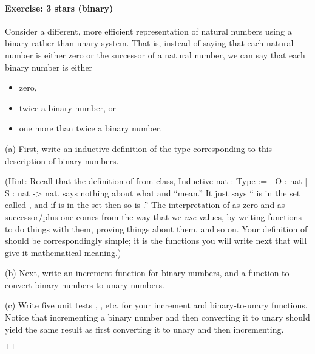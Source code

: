 \documentclass[12pt]{report}
\begin{document}
\paragraph{Exercise: 3 stars (binary)}

 Consider a different, more efficient representation of natural
    numbers using a binary rather than unary system.  That is, instead
    of saying that each natural number is either zero or the successor
    of a natural number, we can say that each binary number is either



\begin{itemize}
\item  zero,

\item  twice a binary number, or

\item  one more than twice a binary number.

\end{itemize}


    (a) First, write an inductive definition of the type 
        corresponding to this description of binary numbers. 


    (Hint: Recall that the definition of  from class,
    Inductive nat : Type :=
      | O : nat
      | S : nat -> nat.
    says nothing about what  and  ``mean.''  It just says `` is
    in the set called , and if  is in the set then so is 
    .''  The interpretation of  as zero and  as successor/plus
    one comes from the way that we \textit{use}  values, by writing
    functions to do things with them, proving things about them, and
    so on.  Your definition of  should be correspondingly simple;
    it is the functions you will write next that will give it
    mathematical meaning.)


    (b) Next, write an increment function  for binary numbers, 
        and a function  to convert binary numbers to unary numbers.


    (c) Write five unit tests , , etc.
        for your increment and binary-to-unary functions. Notice that 
        incrementing a binary number and then converting it to unary 
        should yield the same result as first converting it to unary and 
        then incrementing. 
\begin{coqdoccode}
\coqdocemptyline
\end{coqdoccode}
\ensuremath{\Box} \begin{coqdoccode}
\coqdocemptyline
\end{coqdoccode}
\end{document}
